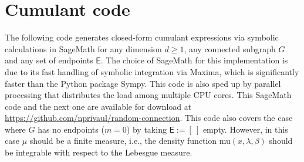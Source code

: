 \documentclass[12pt]{article}
\newcommand{\EE}{\mathsf{E}}
\numberwithin{equation}{section}
\begin{document}
\section{Cumulant code}
\label{fjkldsf}
\noindent  
The following code generates closed-form cumulant expressions 
via symbolic calculations in SageMath for any dimension $d\geq 1$,
any connected subgraph $G$ and any set of endpoints $\EE$. 
The choice of SageMath for this implementation
is due to its fast handling of symbolic integration via Maxima, which is significantly faster than the Python package Sympy. 
This code is also sped up by parallel processing that
distributes the load among multiple CPU cores. 
This SageMath code and the next one
are available for download at
\url{https://github.com/nprivaul/random-connection}.  
This code also covers the case where $G$ has no endpoints ($m=0$)
by taking $\EE :=[ \ ]$ empty. However,
in this case $\mu$ should be a finite measure, i.e., 
the density function mu$(x,\lambda ,\beta )$ should be
integrable with respect to the Lebesgue measure.

\bigskip
\end{document}
